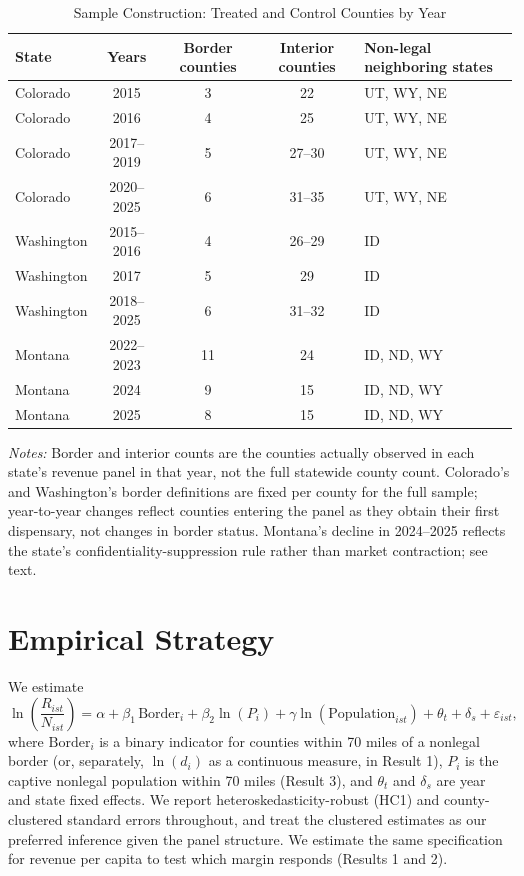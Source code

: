 \documentclass[12pt]{article}
\begin{document}
\begin{table}[htbp]
\centering
\caption{Sample Construction: Treated and Control Counties by Year}
\label{tab:sample_construction}
\small
\begin{tabular}{lcccl}
\toprule
State & Years & Border counties & Interior counties & Non-legal neighboring states \\
\midrule
Colorado & 2015 & 3 & 22 & UT, WY, NE \\
Colorado & 2016 & 4 & 25 & UT, WY, NE \\
Colorado & 2017--2019 & 5 & 27--30 & UT, WY, NE \\
Colorado & 2020--2025 & 6 & 31--35 & UT, WY, NE \\
Washington & 2015--2016 & 4 & 26--29 & ID \\
Washington & 2017 & 5 & 29 & ID \\
Washington & 2018--2025 & 6 & 31--32 & ID \\
Montana & 2022--2023 & 11 & 24 & ID, ND, WY \\
Montana & 2024 & 9 & 15 & ID, ND, WY \\
Montana & 2025 & 8 & 15 & ID, ND, WY \\
\bottomrule
\end{tabular}
\begin{minipage}{0.95\textwidth}
\vspace{0.3em}
\footnotesize
\textit{Notes:} Border and interior counts are the counties actually observed in each state's revenue panel
in that year, not the full statewide county count. Colorado's and Washington's border definitions are fixed
per county for the full sample; year-to-year changes reflect counties entering the panel as they obtain
their first dispensary, not changes in border status. Montana's decline in 2024--2025 reflects the state's
confidentiality-suppression rule rather than market contraction; see text.
\end{minipage}
\end{table}

\section{Empirical Strategy}

We estimate
\begin{equation}
\ln\left(\frac{R_{ist}}{N_{ist}}\right) = \alpha + \beta_1\,\text{Border}_i + \beta_2 \ln(P_i) + \gamma\ln(\text{Population}_{ist}) + \theta_t + \delta_s + \varepsilon_{ist},
\end{equation}
where $\text{Border}_i$ is a binary indicator for counties within 70 miles of a nonlegal border (or,
separately, $\ln(d_i)$ as a continuous measure, in Result 1), $P_i$ is the captive nonlegal population within
70 miles (Result 3), and $\theta_t$ and $\delta_s$ are year and state fixed effects. We report
heteroskedasticity-robust (HC1) and county-clustered standard errors throughout, and treat the clustered
estimates as our preferred inference given the panel structure. We estimate the same specification for
revenue per capita to test which margin responds (Results 1 and 2).
\end{document}
